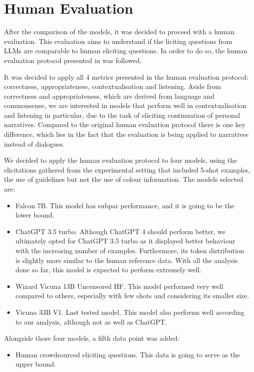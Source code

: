 
\section{Human Evaluation}
After the comparison of the models, it was decided to proceed with a human evaluation. This evaluation aims to understand if the liciting questions from LLMs are comparable to human eliciting questions. In order to do so, the human evaluation protocol presented in \cite{mousavi-etal-2022-evaluation} was followed. 

It was decided to apply all 4 metrics presented in the human evaluation protocol: correctness, appropriateness, contextualisation and listening. Aside from correctness and appropriateness, which are derived from language and commonsense, we are interested in models that perform well in contextualisation and listening in particular, due to the task of eliciting continuation of personal narratives. Compared to the original human evaluation protocol there is one key difference, which lies in the fact that the evaluation is being applied to narratives instead of dialogues. 

We decided to apply the human evaluation protocol to four models, using the elicitations gathered from the experimental setting that included 5-shot examples, the use of guidelines but not the use of colour information. The models selected are:
\begin{itemize}
\item Falcon 7B. This model has subpar performance, and it is going to be the lower bound.
    \item ChatGPT 3.5 turbo. Although ChatGPT 4 should perform better, we ultimately opted for ChatGPT 3.5 turbo as it displayed better behaviour with the increasing number of examples. Furthermore, its token distribution is slightly more similar to the human reference data. With all the analysis done so far, this model is expected to perform extremely well.
    \item Wizard Vicuna 13B Uncensored HF. This model performed very well compared to others, especially with few shots and considering its smaller size.
    \item Vicuna 33B V1. Last tested model. This model also performs well according to our analysis, although not as well as ChatGPT.
\end{itemize}
Alongside those four models, a fifth data point was added:
\begin{itemize}
    \item Human crowdsourced eliciting questions. This data is going to serve as the upper bound.
\end{itemize}


